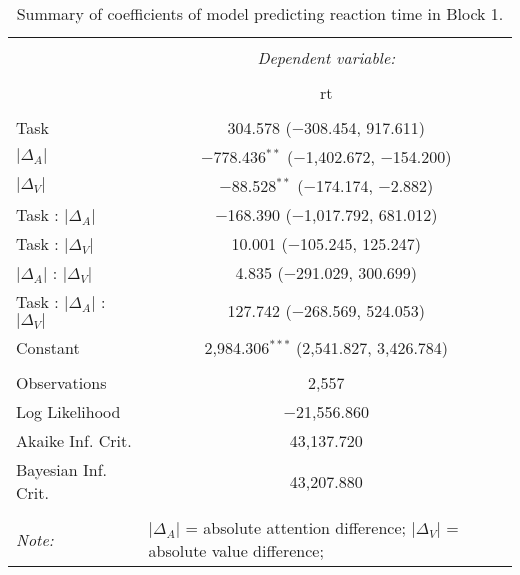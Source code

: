 
\begin{table}[t] \centering 
  \caption{Summary of coefficients of model predicting reaction time in Block 1.} 
  \label{table:rtModelBlock1} 
\begin{tabular}{@{\extracolsep{5pt}}lc} 
\\[-1.8ex]\hline 
\hline \\[-1.8ex] 
 & \multicolumn{1}{c}{\textit{Dependent variable:}} \\ 
\cline{2-2} 
\\[-1.8ex] & rt \\ 
\hline \\[-1.8ex] 
 Task & 304.578 ($-$308.454, 917.611) \\ 
  $\vert\Delta_A\vert$ & $-$778.436$^{**}$ ($-$1,402.672, $-$154.200) \\ 
  $\vert\Delta_V\vert$ & $-$88.528$^{**}$ ($-$174.174, $-$2.882) \\ 
  Task : $\vert\Delta_A\vert$ & $-$168.390 ($-$1,017.792, 681.012) \\ 
  Task : $\vert\Delta_V\vert$ & 10.001 ($-$105.245, 125.247) \\ 
  $\vert\Delta_A\vert$ : $\vert\Delta_V\vert$ & 4.835 ($-$291.029, 300.699) \\ 
  Task : $\vert\Delta_A\vert$ :  $\vert\Delta_V\vert$ & 127.742 ($-$268.569, 524.053) \\ 
  Constant & 2,984.306$^{***}$ (2,541.827, 3,426.784) \\ 
 \hline \\[-1.8ex] 
Observations & 2,557 \\ 
Log Likelihood & $-$21,556.860 \\ 
Akaike Inf. Crit. & 43,137.720 \\ 
Bayesian Inf. Crit. & 43,207.880 \\ 
\hline 
\hline \\[-1.8ex] 
\textit{Note:}  & \multicolumn{1}{l}{\footnotesize $\vert\Delta_A\vert$ = absolute attention difference; $\vert\Delta_V\vert$ = absolute value difference; } \\ 
\end{tabular} 
\end{table} 
